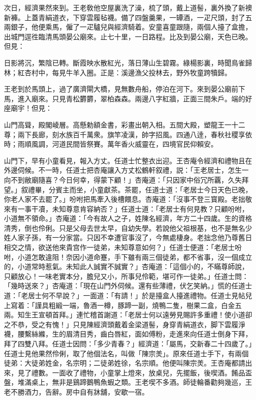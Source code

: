 次日，經濟果然來到。王老敎他空屋裏洗了澡，梳了頭，戴上道髻，裏外換了新襖新褲。上蓋青絹道衣，下穿雲履毡襪。備了四盤羹果，一罈酒，一疋尺頭，封了五兩銀子，他便乘馬，僱了一疋驢兒與經濟騎着。安童喜童跟隨，兩個人擡了盒擔，出城門逕徃臨清馬頭晏公廟來。止七十里，一日路程。比及到晏公廟，天色已晚。但見：

\begin{myquote}
日影將沉，繁陰已轉。斷霞映水散紅光，落日薄山生碧霧。綠楊影裏，時聞鳥雀歸林；紅杏村中，每見牛羊入圈。正是：溪邊漁父投林去，野外牧童跨犢歸。
\end{myquote}

王老到於馬頭上，過了廣濟閘大橋，見無數舟船，停泊在河下。來到晏公廟前下馬，進入廟來。只見青松欝欝，翠柏森森。兩邊八字紅牆，正面三間朱戶。端的好座廟宇！但見：

\begin{myquote}
山門高聳，殿閣崚層。高懸勅額金書，彩畫出朝入相。五間大殿，塑龍王一十二尊；兩下長廊，刻水族百千萬衆。旗竿凌漢，帥字招風。四通八逹，春秋社稷享依時；雨順風調，河道民間皆祭賽。萬年香火威靈在，四境官民仰賴安。
\end{myquote}

山門下，早有小童看見，報入方丈。任道士忙整衣出迎。王杏庵令經濟和禮物且在外邊伺候。不一時，任道士把杏庵讓入方丈松鶴軒叙禮，説：「王老居士，怎生一向不到敝廟隨喜？今日何幸，得蒙下顧！」杏庵道：「只因家中俗冗所覊，久失拜望。」叙禮畢，分賓主而坐，小童獻茶。茶罷，任道士道：「老居士今日天色已晚，你老人家不去罷了。」吩咐把馬牽入後槽餵息。杏庵道：「沒事不登三寳殿。老拙敬來有一事干凟，未知尊意肯容納否？」任道士道：「老居士有何見教？只顧吩咐，小道無不領命。」杏庵道：「今有故人之子，姓陳名經濟，年方二十四歲。生的資格清秀，倒也伶俐。只是父母去世太早，自幼失學。若說他父祖根基，也不是無名少姓人家子孫，有一分家當。只因不幸遭官事沒了，今無處棲身。老拙念他乃尊舊日相交之情，欲送他來貴宫作一徒弟，未知尊意如何？」任道士便道：「老居士吩咐，小道怎敢違阻！奈因小道命蹇，手下雖有兩三個徒弟，都不省事，沒一個成立的，小道常時惹氣。未知此人誠實不誠實？」杏庵道：「這個小的，不瞞尊師說，只顧放心！一味老實本分，膽兒又小，所事兒伶範，堪可作一徒弟。」任道士問：「幾時送來？」杏庵道：「現在山門外伺候。還有些薄禮，伏乞笑納。」慌的任道士道：「老居士何不早說？」一面道：「有請！」於是擡盒人擡進禮物。任道士見帖兒上寫着：「謹具粗緞一端，魯酒一樽，豚蹄一副，燒鴨二隻，樹果二盒，白金五兩。知生王宣頓首拜。」連忙稽首謝道：「老居士何以遠勞見賜許多重禮！使小道卻之不恭，受之有愧！」只見陳經濟頭戴着金梁道髻，身穿青絹道衣，脚下雲履淨襪，腰繫絲縧，生的眉清目秀，齒白唇紅，面如傅粉，走進來向任道士倒身下拜，拜了四雙八拜。任道士因問：「多少青春？」經濟道：「屬馬，交新春二十四歲了。」任道士見他果然伶俐，取了他個法名，叫做「陳宗羙」。原來任道士手下，有兩個徒弟：大徒弟姓金，名宗明；二徒弟姓徐，名宗順。他便叫陳宗羙。王杏庵都請出來，見了禮數。一面收了禮物，小童掌上燈來，放桌兒，先擺飯，後喫酒。餚品盃盤，堆滿桌上，無非是鷄蹄鵝鴨魚蝦之類。王老喫不多酒。師徒輪番勸夠幾巡，王老不勝酒力，告辭。房中自有牀舖，安歇一宿。

